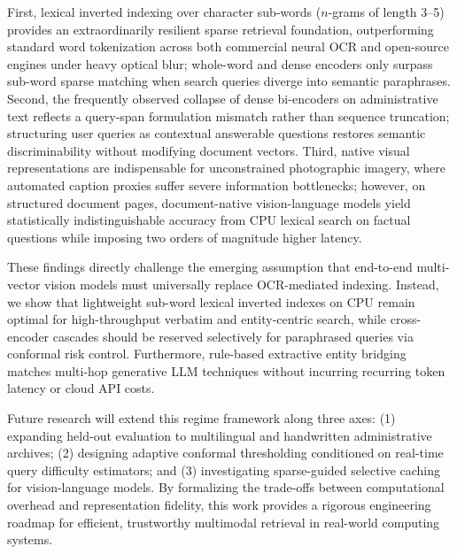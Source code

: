 \documentclass[conference]{IEEEtran}
\begin{document}
First, lexical inverted indexing over character sub-words ($n$-grams of length 3--5) provides an extraordinarily resilient sparse retrieval foundation, outperforming standard word tokenization across both commercial neural OCR and open-source engines under heavy optical blur; whole-word and dense encoders only surpass sub-word sparse matching when search queries diverge into semantic paraphrases. Second, the frequently observed collapse of dense bi-encoders on administrative text reflects a query-span formulation mismatch rather than sequence truncation; structuring user queries as contextual answerable questions restores semantic discriminability without modifying document vectors. Third, native visual representations are indispensable for unconstrained photographic imagery, where automated caption proxies suffer severe information bottlenecks; however, on structured document pages, document-native vision-language models yield statistically indistinguishable accuracy from CPU lexical search on factual questions while imposing two orders of magnitude higher latency.

These findings directly challenge the emerging assumption that end-to-end multi-vector vision models must universally replace OCR-mediated indexing. Instead, we show that lightweight sub-word lexical inverted indexes on CPU remain optimal for high-throughput verbatim and entity-centric search, while cross-encoder cascades should be reserved selectively for paraphrased queries via conformal risk control. Furthermore, rule-based extractive entity bridging matches multi-hop generative LLM techniques without incurring recurring token latency or cloud API costs.

Future research will extend this regime framework along three axes: (1) expanding held-out evaluation to multilingual and handwritten administrative archives; (2) designing adaptive conformal thresholding conditioned on real-time query difficulty estimators; and (3) investigating sparse-guided selective caching for vision-language models. By formalizing the trade-offs between computational overhead and representation fidelity, this work provides a rigorous engineering roadmap for efficient, trustworthy multimodal retrieval in real-world computing systems.

\end{document}
